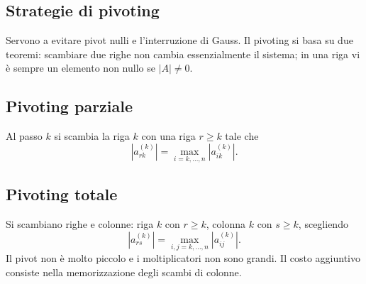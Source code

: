 \documentclass[11pt,a4paper]{article}
\newcommand{\pagina}[1]{\clearpage}
\begin{document}
\subsection*{Strategie di pivoting}
Servono a evitare pivot nulli e l'interruzione di Gauss.
\pagina{24}
Il pivoting si basa su due teoremi: scambiare due righe non cambia essenzialmente il sistema; in una riga vi è sempre un elemento non nullo se $|A|\ne0$.
\subsection*{Pivoting parziale}
Al passo $k$ si scambia la riga $k$ con una riga $r\ge k$ tale che
\[|a_{rk}^{(k)}|=\max_{i=k,\ldots,n}|a_{ik}^{(k)}|.\]
\subsection*{Pivoting totale}
Si scambiano righe e colonne: riga $k$ con $r\ge k$, colonna $k$ con $s\ge k$, scegliendo
\[|a_{rs}^{(k)}|=\max_{i,j=k,\ldots,n}|a_{ij}^{(k)}|.\]
Il pivot non è molto piccolo e i moltiplicatori non sono grandi. Il costo aggiuntivo consiste nella memorizzazione degli scambi di colonne.
\end{document}
